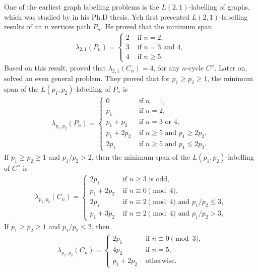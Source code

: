 One of the earliest graph labelling problems is the $L(2,1)$-labelling of graphs, which was studied by \cite{yeh90} in his Ph.D thesis. Yeh first presented $L(2,1)$-labelling results of an $n$ vertices path $P_n$. He proved that the minimum span
\begin{align*}
\lambda_{2,1}(P_n) = 
\begin{cases}
2 & \text{ if } n = 2,\\
3 & \text{ if } n = 3 \text{ and }4,\\
4 & \text{ if } n \ge 5.
\end{cases}
\end{align*}
Based on this result, \cite{griggs92} proved that $\lambda_{2,1}(C_n) = 4$, for any $n$-cycle $C^n$. Later on, \cite{georges95} solved an even general problem. They proved that for $p_1 \ge p_2 \ge 1$, the minimum span of the $L(p_1, p_2)$-labelling of $P_n$ is 
\begin{align*}
\lambda_{p_1, p_2}(P_n) = 
\begin{cases}
0 & \text{ if } n =1, \\
p_1 & \text{ if } n = 2, \\
p_1 + p_2 & \text{ if } n = 3 \text{ or } 4, \\
p_1 + 2p_2 & \text{ if } n \ge 5 \text{ and } p_1 \ge 2p_2, \\
2p_1 & \text{ if } n \ge 5 \text{ and } p_1 \le 2p_2. 
\end{cases}
\end{align*}
If $p_1 \ge p_2 \ge 1$ and $p_1/p_2 > 2$, then the minimum span of the $L(p_1, p_2)$-labelling of $C^n$ is 
\begin{align*}
\lambda_{p_1, p_2}(C_n) = 
\begin{cases}
2p_1 & \text{ if } n \ge 3 \text{ is odd}, \\
p_1+2p_2 & \text{ if } n \equiv 0 \pmod{4}, \\
2p_1 & \text{ if } n \equiv 2 \pmod{4} \text{ and } p_1/p_2 \le 3,\\
p_1+3p_2 & \text{ if } n \equiv 2 \pmod{4} \text{ and } p_1/p_2 >3,
\end{cases}
\end{align*} 
If $p_1 \ge p_2 \ge 1$ and $p_1/p_2 \le 2$, then 
\begin{align*}
\lambda_{p_1, p_2}(C_n) = 
\begin{cases}
2p_1 & \text{ if } n \equiv 0 \pmod{3}, \\
4p_2 & \text{ if } n = 5, \\
p_1 + 2p_2 & \text{ otherwise.} 
\end{cases}
\end{align*}

